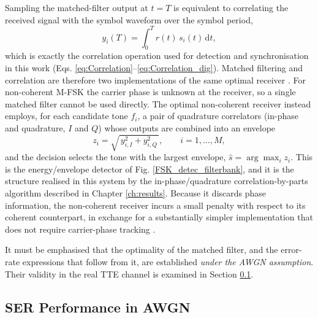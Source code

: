 Sampling the matched-filter output at $t = T$ is equivalent to correlating the
received signal with the symbol waveform over the symbol period,
\begin{equation}
    y_i(T) = \int_0^{T} r(t)\,s_i(t)\,\mathrm{d}t,
    \label{eq:correlation_mf}
\end{equation}
which is exactly the correlation operation used for detection and synchronisation
in this work (Eqs. \ref{eq:Correlation}--\ref{eq:Correlation_dig}). Matched
filtering and correlation are therefore two implementations of the same optimal
receiver \cite{sklar2021digital}.
\newp
For non-coherent M-FSK the carrier phase is unknown at the receiver, so a single
matched filter cannot be used directly. The optimal non-coherent receiver instead
employs, for each candidate tone $f_i$, a pair of quadrature correlators (in-phase
and quadrature, $I$ and $Q$) whose outputs are combined into an envelope
\begin{equation}
    z_i = \sqrt{\,y_{i,I}^{2} + y_{i,Q}^{2}\,}, \qquad i = 1, \dots, M,
    \label{eq:envelope}
\end{equation}
and the decision selects the tone with the largest envelope,
$\hat{s} = \arg\max_i z_i$. This is the energy/envelope detector of
Fig. \ref{FSK_detec_filterbank}, and it is the structure realised in this
system by the in-phase/quadrature correlation-by-parts algorithm described in
Chapter \ref{ch:results}. Because it discards phase information, the
non-coherent receiver incurs a small penalty with respect to its coherent
counterpart, in exchange for a substantially simpler implementation that does not
require carrier-phase tracking \cite{sklar2021digital}.

It must be emphasised that the optimality of the matched filter, and the
error-rate expressions that follow from it, are established \emph{under the AWGN
assumption}. Their validity in the real TTE channel is examined in
Section \ref{subsec:ber-awgn}.


\subsection{SER Performance in AWGN}\label{subsec:ber-awgn}


